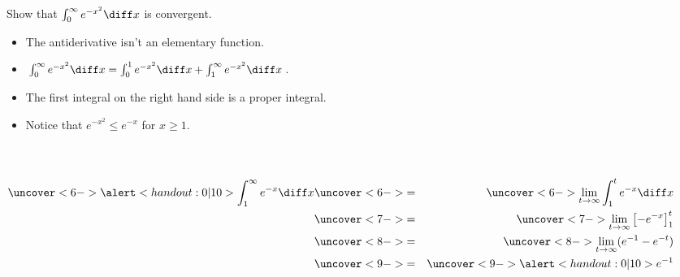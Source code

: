 \begin{frame}
\begin{example}[Example 9, p. 550]
Show that $\int_0^\infty e^{-x^2}\diff x$ is convergent.
\begin{itemize}
\item<2->  The antiderivative isn't an elementary function.
\item<3->  $\int_0^\infty e^{-x^2}\diff x = \int_0^1 e^{-x^2}\diff x + \int_1^\infty e^{-x^2}\diff x$.
\item<4->  The first integral on the right hand side is a proper integral.
\item<5-| alert@10>  Notice that $e^{-x^2} \leq e^{-x}$ for $x\geq 1$.
\end{itemize}
\begin{columns}[c]
\ %
\begin{eqnarray*}
\uncover<6->{%
\alert<handout:0| 10>{\int_1^\infty e^{-x}\diff x}%
}%
& \uncover<6->{ = } & %
\uncover<6->{%
\lim_{t\rightarrow \infty} \int_1^t e^{-x}\diff x%
}\\%
& \uncover<7->{ = } & %
\uncover<7->{%
\lim_{t\rightarrow \infty} \left[ -e^{-x}\right]_1^t
}\\%
& \uncover<8->{ = } & %
\uncover<8->{%
\lim_{t\rightarrow \infty} (e^{-1} - e^{-t})%
}\\%
& \uncover<9->{ = } & %
\uncover<9->{%
\alert<handout:0| 10>{e^{-1}}
}%
\end{eqnarray*}
\end{columns}
%
\end{example}
\end{frame}
